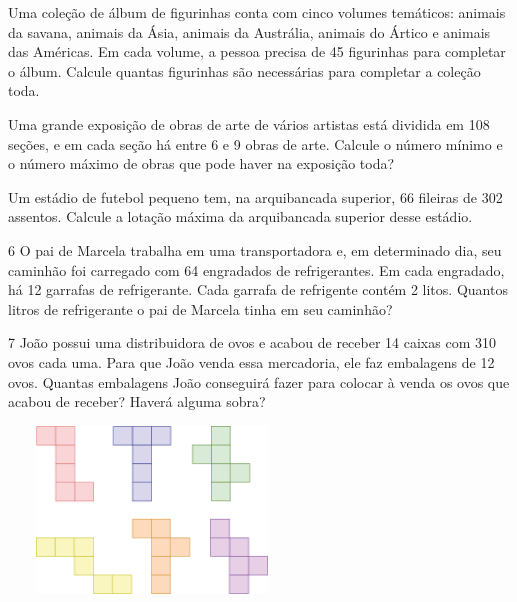 \begin{escolha}
\item Uma coleção de álbum de figurinhas conta com cinco volumes temáticos: animais da savana, animais da Ásia, animais da Austrália, animais do Ártico e animais das Américas. Em cada volume, a pessoa precisa de 45 figurinhas para completar o álbum. Calcule quantas figurinhas são necessárias para completar a coleção toda.

\item Uma grande exposição de obras de arte de vários artistas está dividida em 108 seções, e em cada seção há entre 6 e 9 obras de arte. Calcule o número mínimo e o número máximo de obras que pode haver na exposição toda?

\item Um estádio de futebol pequeno tem, na arquibancada superior, 66 fileiras de 302 assentos. Calcule a lotação máxima da arquibancada superior desse estádio.
\end{escolha}

\num{6} O pai de Marcela trabalha em uma transportadora e, em determinado
dia, seu caminhão foi carregado com 64 engradados de refrigerantes.
Em cada engradado, há 12 garrafas de refrigerante. Cada garrafa de refrigente
contém 2 litos. Quantos litros de
refrigerante o pai de Marcela tinha em seu caminhão?

\begin{mdframed}[linewidth=2pt,linecolor=salmao,roundcorner=2pt]
\vspace{2cm}
\end{mdframed}

\num{7} João
possui uma distribuidora de ovos e acabou de receber 14 caixas com 310
ovos cada uma. Para que João venda essa mercadoria, ele faz embalagens
de 12 ovos. Quantas embalagens João conseguirá fazer para
colocar à venda os ovos que acabou de receber? Haverá alguma sobra?

\includegraphics[width=3.00278in,height=1.75833in]{media/image36.png}


